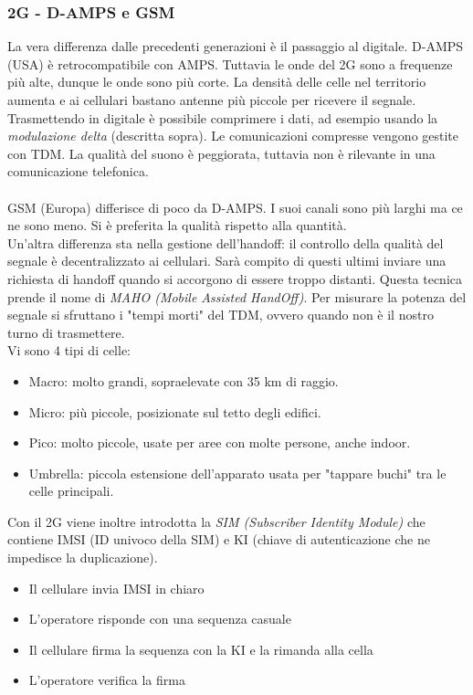 \documentclass[10pt,a4paper,twoside]{article}
\begin{document}
\subsubsection{2G - D-AMPS e GSM}
La vera differenza dalle precedenti generazioni è il passaggio al digitale. D-AMPS (USA) è retrocompatibile con AMPS. Tuttavia le onde del 2G sono a frequenze più alte, dunque le onde sono più corte. La densità delle celle nel territorio aumenta e ai cellulari bastano antenne più piccole per ricevere il segnale.\\
Trasmettendo in digitale è possibile comprimere i dati, ad esempio usando la \textit{modulazione delta} (descritta sopra).
Le comunicazioni compresse vengono gestite con TDM. La qualità del suono è peggiorata, tuttavia non è rilevante in una comunicazione telefonica.\\\\
GSM (Europa) differisce di poco da D-AMPS. I suoi canali sono più larghi ma ce ne sono meno. Si è preferita la qualità rispetto alla quantità.\\
Un'altra differenza sta nella gestione dell'handoff: il controllo della qualità del segnale è decentralizzato ai cellulari. Sarà compito di questi ultimi inviare una richiesta di handoff quando si accorgono di essere troppo distanti. Questa tecnica prende il nome di \textit{MAHO (Mobile Assisted HandOff)}. Per misurare la potenza del segnale si sfruttano i "tempi morti" del TDM, ovvero quando non è il nostro turno di trasmettere.\\
Vi sono 4 tipi di celle:
\begin{itemize}
\item Macro: molto grandi, sopraelevate con 35 km di raggio.
\item Micro: più piccole, posizionate sul tetto degli edifici.
\item Pico: molto piccole, usate per aree con molte persone, anche indoor.
\item Umbrella: piccola estensione dell'apparato usata per "tappare buchi" tra le celle principali.
\end{itemize}
Con il 2G viene inoltre introdotta la \textit{SIM (Subscriber Identity Module)} che contiene IMSI (ID univoco della SIM) e KI (chiave di autenticazione che ne impedisce la duplicazione).\\
\begin{itemize}
\item Il cellulare invia IMSI in chiaro
\item L'operatore risponde con una sequenza casuale
\item Il cellulare firma la sequenza con la KI e la rimanda alla cella
\item L'operatore verifica la firma
\end{itemize}
\end{document}

